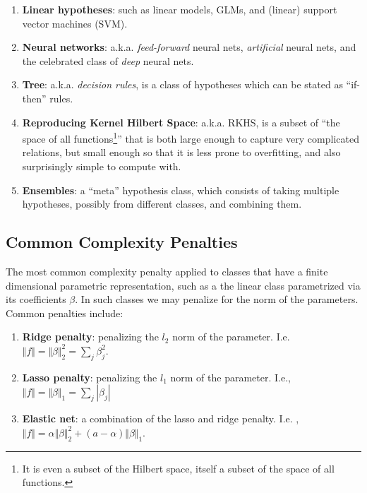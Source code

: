 \documentclass[]{book}
\providecommand{\tightlist}{%
  \setlength{\itemsep}{0pt}\setlength{\parskip}{0pt}}
\theoremstyle{definition}
\theoremstyle{definition}
\theoremstyle{remark}
\begin{document}
\begin{enumerate}
\def\labelenumi{\arabic{enumi}.}
\tightlist
\item
  \textbf{Linear hypotheses}: such as linear models, GLMs, and (linear)
  support vector machines (SVM).
\item
  \textbf{Neural networks}: a.k.a. \emph{feed-forward} neural nets,
  \emph{artificial} neural nets, and the celebrated class of \emph{deep}
  neural nets.
\item
  \textbf{Tree}: a.k.a. \emph{decision rules}, is a class of hypotheses
  which can be stated as ``if-then'' rules.
\item
  \textbf{Reproducing Kernel Hilbert Space}: a.k.a. RKHS, is a subset of
  ``the space of all functions\footnote{It is even a subset of the
    Hilbert space, itself a subset of the space of all functions.}''
  that is both large enough to capture very complicated relations, but
  small enough so that it is less prone to overfitting, and also
  surprisingly simple to compute with.
\item
  \textbf{Ensembles}: a ``meta'' hypothesis class, which consists of
  taking multiple hypotheses, possibly from different classes, and
  combining them.
\end{enumerate}

\subsection{Common Complexity
Penalties}\label{common-complexity-penalties}

The most common complexity penalty applied to classes that have a finite
dimensional parametric representation, such as a the linear class
parametrized via its coefficients \(\beta\). In such classes we may
penalize for the norm of the parameters. Common penalties include:

\begin{enumerate}
\def\labelenumi{\arabic{enumi}.}
\tightlist
\item
  \textbf{Ridge penalty}: penalizing the \(l_2\) norm of the parameter.
  I.e. \(\Vert f \Vert=\Vert \beta \Vert_2^2=\sum_j \beta_j^2\).
\item
  \textbf{Lasso penalty}: penalizing the \(l_1\) norm of the parameter.
  I.e., \(\Vert f \Vert=\Vert \beta \Vert_1=\sum_j |\beta_j|\)
\item
  \textbf{Elastic net}: a combination of the lasso and ridge penalty.
  I.e.
  ,\(\Vert f \Vert= \alpha \Vert \beta \Vert_2^2 + (a-\alpha) \Vert \beta \Vert_1\).
\end{enumerate}
\end{document}
